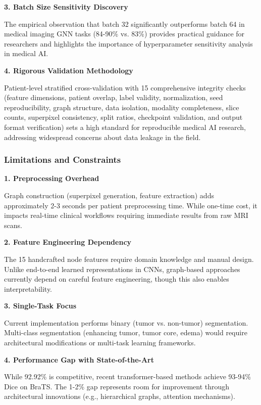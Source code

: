 \textbf{3. Batch Size Sensitivity Discovery}

The empirical observation that batch 32 significantly outperforms batch 64 in medical imaging GNN tasks (84-90\% vs. 83\%) provides practical guidance for researchers and highlights the importance of hyperparameter sensitivity analysis in medical AI.

\textbf{4. Rigorous Validation Methodology}

Patient-level stratified cross-validation with 15 comprehensive integrity checks (feature dimensions, patient overlap, label validity, normalization, seed reproducibility, graph structure, data isolation, modality completeness, slice counts, superpixel consistency, split ratios, checkpoint validation, and output format verification) sets a high standard for reproducible medical AI research, addressing widespread concerns about data leakage in the field.

\subsubsection{Limitations and Constraints}

\textbf{1. Preprocessing Overhead}

Graph construction (superpixel generation, feature extraction) adds approximately 2-3 seconds per patient preprocessing time. While one-time cost, it impacts real-time clinical workflows requiring immediate results from raw MRI scans.

\textbf{2. Feature Engineering Dependency}

The 15 handcrafted node features require domain knowledge and manual design. Unlike end-to-end learned representations in CNNs, graph-based approaches currently depend on careful feature engineering, though this also enables interpretability.

\textbf{3. Single-Task Focus}

Current implementation performs binary (tumor vs. non-tumor) segmentation. Multi-class segmentation (enhancing tumor, tumor core, edema) would require architectural modifications or multi-task learning frameworks.

\textbf{4. Performance Gap with State-of-the-Art}

While 92.92\% is competitive, recent transformer-based methods achieve 93-94\% Dice on BraTS. The 1-2\% gap represents room for improvement through architectural innovations (e.g., hierarchical graphs, attention mechanisms).


